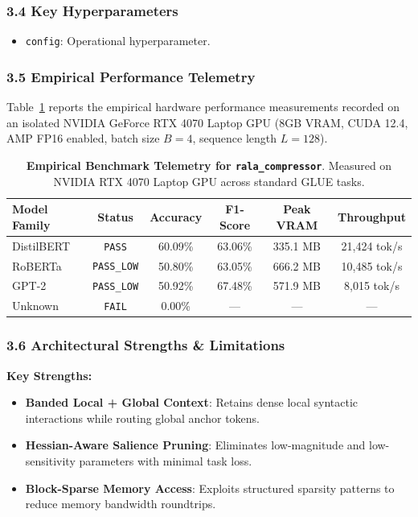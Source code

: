 \subsubsection*{3.4 Key Hyperparameters}
\begin{itemize}
    \item \texttt{config}: Operational hyperparameter.
\end{itemize}

\subsubsection*{3.5 Empirical Performance Telemetry}
Table~\ref{tab:telemetry_rala_compressor} reports the empirical hardware performance measurements recorded on an isolated NVIDIA GeForce RTX 4070 Laptop GPU (8GB VRAM, CUDA 12.4, AMP FP16 enabled, batch size $B=4$, sequence length $L=128$).

\begin{table}[h]
\centering
\small
\caption{\textbf{Empirical Benchmark Telemetry for \texttt{rala\_compressor}}. Measured on NVIDIA RTX 4070 Laptop GPU across standard GLUE tasks.}
\label{tab:telemetry_rala_compressor}
\begin{tabular*}{\columnwidth}{@{\extracolsep{\fill}}lccccc}
\toprule
\textbf{Model Family} & \textbf{Status} & \textbf{Accuracy} & \textbf{F1-Score} & \textbf{Peak VRAM} & \textbf{Throughput} \\
\midrule
DistilBERT & \texttt{PASS} & 60.09\% & 63.06\% & 335.1 MB & 21,424 tok/s \\
RoBERTa & \texttt{PASS\_LOW} & 50.80\% & 63.05\% & 666.2 MB & 10,485 tok/s \\
GPT-2 & \texttt{PASS\_LOW} & 50.92\% & 67.48\% & 571.9 MB & 8,015 tok/s \\
Unknown & \texttt{FAIL} & 0.00\% & --- & --- & --- \\
\bottomrule
\end{tabular*}
\end{table}

\subsubsection*{3.6 Architectural Strengths \& Limitations}
\textbf{Key Strengths:}
\begin{itemize}
    \item \textbf{Banded Local + Global Context}: Retains dense local syntactic interactions while routing global anchor tokens.
    \item \textbf{Hessian-Aware Salience Pruning}: Eliminates low-magnitude and low-sensitivity parameters with minimal task loss.
    \item \textbf{Block-Sparse Memory Access}: Exploits structured sparsity patterns to reduce memory bandwidth roundtrips.
\end{itemize}

